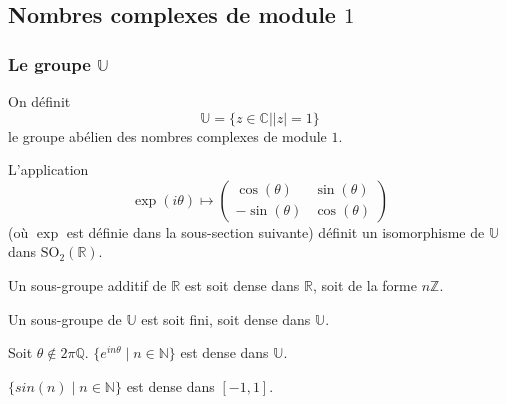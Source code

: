 




	\subsection{Nombres complexes de module \texorpdfstring{$1$}{1}}

	\subsubsection{Le groupe \texorpdfstring{$\mathbb{U}$}{U}}


	\begin{definition}
		On définit
		\[ \mathbb{U} = \{ z \in \mathbb{C} \mid \vert z \vert = 1 \} \]
		le groupe abélien des nombres complexes de module $1$.
	\end{definition}

	\begin{proposition}
		L'application
		\[ \exp(i\theta) \mapsto
			\begin{pmatrix}
				\cos(\theta) & \sin(\theta) \\
				-\sin(\theta) & \cos(\theta)
			\end{pmatrix}
		\]
		(où $\exp$ est définie dans la sous-section suivante) définit un isomorphisme de $\mathbb{U}$ dans $\mathrm{SO}_2(\mathbb{R})$.
	\end{proposition}


	\begin{proposition}
		Un sous-groupe additif de $\mathbb{R}$ est soit dense dans $\mathbb{R}$, soit de la forme $n\mathbb{Z}$.
	\end{proposition}

	\begin{corollary}
		Un sous-groupe de $\mathbb{U}$ est soit fini, soit dense dans $\mathbb{U}$.
	\end{corollary}

	\begin{corollary}
		Soit $\theta \notin 2\pi\mathbb{Q}$. $\{ e^{in\theta} \mid n \in \mathbb{N} \}$ est dense dans $\mathbb{U}$.
	\end{corollary}

	\begin{application}
		$\{ sin(n) \mid n \in \mathbb{N} \}$ est dense dans $[-1,1]$.
	\end{application}

